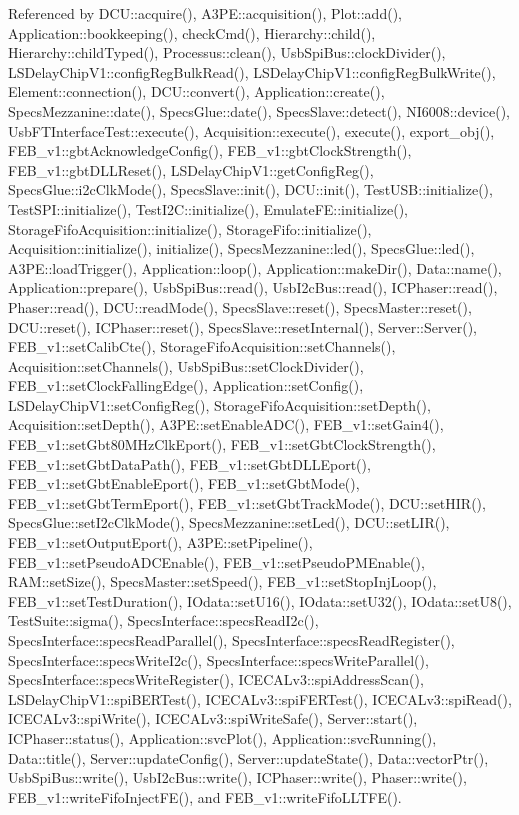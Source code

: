 Referenced by DCU::acquire(), A3PE::acquisition(), Plot::add(), Application::bookkeeping(), checkCmd(), Hierarchy::child(), Hierarchy::childTyped(), Processus::clean(), UsbSpiBus::clockDivider(), LSDelayChipV1::configRegBulkRead(), LSDelayChipV1::configRegBulkWrite(), Element::connection(), DCU::convert(), Application::create(), SpecsMezzanine::date(), SpecsGlue::date(), SpecsSlave::detect(), NI6008::device(), UsbFTInterfaceTest::execute(), Acquisition::execute(), execute(), export\_\-obj(), FEB\_\-v1::gbtAcknowledgeConfig(), FEB\_\-v1::gbtClockStrength(), FEB\_\-v1::gbtDLLReset(), LSDelayChipV1::getConfigReg(), SpecsGlue::i2cClkMode(), SpecsSlave::init(), DCU::init(), TestUSB::initialize(), TestSPI::initialize(), TestI2C::initialize(), EmulateFE::initialize(), StorageFifoAcquisition::initialize(), StorageFifo::initialize(), Acquisition::initialize(), initialize(), SpecsMezzanine::led(), SpecsGlue::led(), A3PE::loadTrigger(), Application::loop(), Application::makeDir(), Data::name(), Application::prepare(), UsbSpiBus::read(), UsbI2cBus::read(), ICPhaser::read(), Phaser::read(), DCU::readMode(), SpecsSlave::reset(), SpecsMaster::reset(), DCU::reset(), ICPhaser::reset(), SpecsSlave::resetInternal(), Server::Server(), FEB\_\-v1::setCalibCte(), StorageFifoAcquisition::setChannels(), Acquisition::setChannels(), UsbSpiBus::setClockDivider(), FEB\_\-v1::setClockFallingEdge(), Application::setConfig(), LSDelayChipV1::setConfigReg(), StorageFifoAcquisition::setDepth(), Acquisition::setDepth(), A3PE::setEnableADC(), FEB\_\-v1::setGain4(), FEB\_\-v1::setGbt80MHzClkEport(), FEB\_\-v1::setGbtClockStrength(), FEB\_\-v1::setGbtDataPath(), FEB\_\-v1::setGbtDLLEport(), FEB\_\-v1::setGbtEnableEport(), FEB\_\-v1::setGbtMode(), FEB\_\-v1::setGbtTermEport(), FEB\_\-v1::setGbtTrackMode(), DCU::setHIR(), SpecsGlue::setI2cClkMode(), SpecsMezzanine::setLed(), DCU::setLIR(), FEB\_\-v1::setOutputEport(), A3PE::setPipeline(), FEB\_\-v1::setPseudoADCEnable(), FEB\_\-v1::setPseudoPMEnable(), RAM::setSize(), SpecsMaster::setSpeed(), FEB\_\-v1::setStopInjLoop(), FEB\_\-v1::setTestDuration(), IOdata::setU16(), IOdata::setU32(), IOdata::setU8(), TestSuite::sigma(), SpecsInterface::specsReadI2c(), SpecsInterface::specsReadParallel(), SpecsInterface::specsReadRegister(), SpecsInterface::specsWriteI2c(), SpecsInterface::specsWriteParallel(), SpecsInterface::specsWriteRegister(), ICECALv3::spiAddressScan(), LSDelayChipV1::spiBERTest(), ICECALv3::spiFERTest(), ICECALv3::spiRead(), ICECALv3::spiWrite(), ICECALv3::spiWriteSafe(), Server::start(), ICPhaser::status(), Application::svcPlot(), Application::svcRunning(), Data::title(), Server::updateConfig(), Server::updateState(), Data::vectorPtr(), UsbSpiBus::write(), UsbI2cBus::write(), ICPhaser::write(), Phaser::write(), FEB\_\-v1::writeFifoInjectFE(), and FEB\_\-v1::writeFifoLLTFE().


